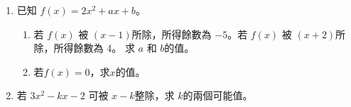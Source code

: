 \documentclass[11pt]{article}
\begin{document}
\begin{enumerate}
            \hrulefill
            
            \hrulefill

        \pagebreak
        \item 已知 $f(x)=2x^2+ax+b$。\begin{enumerate}
            \item 若 $f(x)$ 被 $(x-1)$所除，所得餘數為 $-5$。若 $f(x)$ 被 $(x+2)$所除，所得餘數為 4。 求 $a$ 和 $b$的值。
            \item 若$f(x)=0$，求$x$的值。
        \end{enumerate}
        \hrulefill
            
            \hrulefill
            
            \hrulefill
            
            \hrulefill
            
            \hrulefill
            
            \hrulefill
            
            \hrulefill
            
            \hrulefill
            
            \hrulefill
            
            \hrulefill
            
            \hrulefill

            \hrulefill
            
            \hrulefill
            
            \hrulefill
            
            \hrulefill

            \hrulefill
            
            \hrulefill
            
            \hrulefill
            
            \hrulefill
            
            \hrulefill
            
            \hrulefill
            
            \hrulefill
            
            \hrulefill
            
            \hrulefill
            
            \hrulefill

        \pagebreak
        \item 若 $3x^2-kx-2$ 可被 $x-k$整除，求 $k$的兩個可能值。
            

\end{enumerate}
\end{document}
